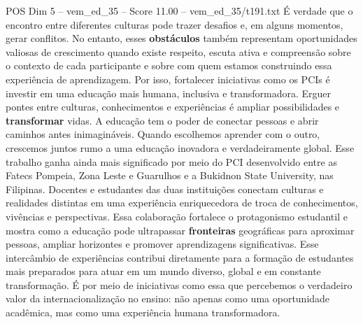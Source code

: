 \begin{textsample}{POS Dim 5 – vem\_ed\_35 – Score 11.00 – vem\_ed\_35/t191.txt}
É verdade que o encontro entre diferentes culturas pode trazer desafios e, em alguns momentos, gerar conflitos.
No entanto, esses \textbf{obstáculos} também representam oportunidades valiosas de crescimento quando existe respeito, escuta ativa e compreensão sobre o contexto de cada participante e sobre com quem estamos construindo essa experiência de aprendizagem.
Por isso, fortalecer iniciativas como os PCIs é investir em uma educação mais humana, inclusiva e transformadora.
Erguer pontes entre culturas, conhecimentos e experiências é ampliar possibilidades e \textbf{transformar} vidas.
A educação tem o poder de conectar pessoas e abrir caminhos antes inimagináveis.
Quando escolhemos aprender com o outro, crescemos juntos rumo a uma educação inovadora e verdadeiramente global.
Esse trabalho ganha ainda mais significado por meio do PCI desenvolvido entre as Fatecs Pompeia, Zona Leste e Guarulhos e a Bukidnon State University, nas Filipinas.
Docentes e estudantes das duas instituições conectam culturas e realidades distintas em uma experiência enriquecedora de troca de conhecimentos, vivências e perspectivas.
Essa colaboração fortalece o protagonismo estudantil e mostra como a educação pode ultrapassar \textbf{fronteiras} geográficas para aproximar pessoas, ampliar horizontes e promover aprendizagens significativas.
Esse intercâmbio de experiências contribui diretamente para a formação de estudantes mais preparados para atuar em um mundo diverso, global e em constante transformação.
É por meio de iniciativas como essa que percebemos o verdadeiro valor da internacionalização no ensino: não apenas como uma oportunidade acadêmica, mas como uma experiência humana transformadora.

\end{textsample}

